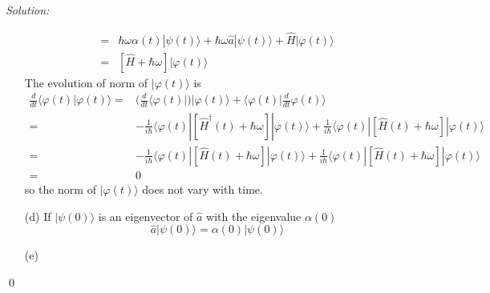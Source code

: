 \documentclass[12pt,a4paper]{article}
\newenvironment{sol}
    {\emph{Solution:}
    }
    {
    \qed
    }
\begin{document}
\begin{sol}
\begin{itemize}
\begin{align}
\nonumber=&\hbar\omega\alpha(t)|\psi(t)\rangle+\hbar\omega\hat{a}|\psi(t)\rangle+\hat{H}|\varphi(t)\rangle\\
=&[\hat{H}+\hbar\omega]|\varphi(t)\rangle
\end{align}
The evolution of norm of $|\varphi(t)\rangle$ is
\begin{align}
\nonumber\frac{d}{dt}\langle\varphi(t)|\varphi(t)\rangle=&(\frac{d}{dt}\langle\varphi(t)|)|\varphi(t)\rangle+\langle\varphi(t)|\frac{d}{dt}\varphi(t)\rangle\\
\nonumber=&-\frac{1}{i\hbar}\langle\varphi(t)|[\hat{H}^{\dagger}(t)+\hbar\omega]|\varphi(t)\rangle+\frac{1}{i\hbar}\langle\varphi(t)|[\hat{H}(t)+\hbar\omega]|\varphi(t)\rangle\\
\nonumber=&-\frac{1}{i\hbar}\langle\varphi(t)|[\hat{H}(t)+\hbar\omega]|\varphi(t)\rangle+\frac{1}{i\hbar}\langle\varphi(t)|[\hat{H}(t)+\hbar\omega]|\varphi(t)\rangle\\
=&0
\end{align}
so the norm of $|\varphi(t)\rangle$ does not vary with time.
\item[(d)] If $|\psi(0)\rangle$ is an eigenvector of $\hat{a}$ with the eigenvalue $\alpha(0)$
\begin{equation}
\hat{a}|\psi(0)\rangle=\alpha(0)|\psi(0)\rangle
\end{equation}
\item[(e)] 
\end{itemize}
\end{sol}
\end{document}

